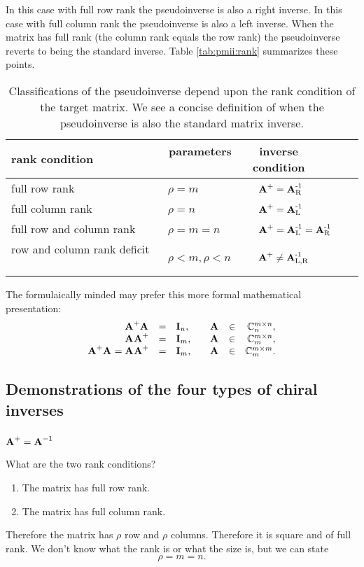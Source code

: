 In this case with full row rank the pseudoinverse is also a right inverse. In this case with full column rank the pseudoinverse is also a left inverse. When the matrix has full rank (the column rank equals the row rank) the pseudoinverse reverts to being the standard inverse. Table \eqref{tab:pmii:rank} summarizes these points.
\begin{table}[bottom]
\begin{center}
\begin{tabular}{lll}
rank condition   & \ parameters \ & \ inverse condition\\\hline\hline
full row rank    & \ $\rho = m $  & \ $\operatorname{\textbf{A}^{\mathrm{+}}} = \operatorname{\textbf{A}^{\mathrm{-1}}_{\mathrm{R}}}$ \\[3pt]
full column rank & \ $\rho = n $  & \ $\operatorname{\textbf{A}^{\mathrm{+}}} = \operatorname{\textbf{A}^{\mathrm{-1}}_{\mathrm{L}}}$ \\[3pt]\hline
full row and column rank \ & \ $\rho = m = n $ \ & \ $\operatorname{\textbf{A}^{\mathrm{+}}} = \operatorname{\textbf{A}^{\mathrm{-1}}_{\mathrm{L}}} = \operatorname{\textbf{A}^{\mathrm{-1}}_{\mathrm{R}}}$\\  row and column rank deficit \ & \ $\rho < m, \rho < n $ \ & \ $\operatorname{\textbf{A}^{\mathrm{+}}} \ne \operatorname{\textbf{A}^{\mathrm{-1}}_{\mathrm{L,R}}}$ \\[6pt]
\end{tabular}
\end{center}
\label{tab:pmii:rank}
\caption{Classifications of the pseudoinverse depend upon the rank condition of the target matrix. We see a concise definition of when the pseudoinverse is also the standard matrix inverse.}
\end{table}%

The formulaically minded may prefer this more formal mathematical presentation:
\begin{equation}
  \begin{array}{rclrcr}
    \operatorname{\textbf{A}^{\mathrm{+}}\textbf{A}^{\mathrm{}}} &=& \textbf{I}_{n}, & \quad \textbf{A}^{\mathrm{}}&\in&\mathbb{C}^{m \times n}_{n},\\
    \operatorname{\textbf{A}^{\mathrm{}}\textbf{A}^{\mathrm{+}}} &=& \textbf{I}_{m}, & \quad \textbf{A}^{\mathrm{}}&\in&\mathbb{C}^{m \times n}_{m},\\
    \operatorname{\textbf{A}^{\mathrm{+}}\textbf{A}^{\mathrm{}}} = \operatorname{\textbf{A}^{\mathrm{}}\textbf{A}^{\mathrm{+}}} &=& \textbf{I}_{m}, & \quad \textbf{A}^{\mathrm{}}&\in&\mathbb{C}^{m \times m}_{m}.\\
  \end{array}
\end{equation}

\subsection{Demonstrations of the four types of chiral inverses}

\subsubsection{$\operatorname{\textbf{A}^{\mathrm{+}}}=\textbf{A}^{\mathrm{-1}}$}
What are the two rank conditions?
\begin{enumerate}
\item The matrix has full row rank.
\item The matrix has full column rank.
\end{enumerate}
Therefore the matrix has $\rho$ row and $\rho$ columns. Therefore it is square and of full rank. We don't know what the rank is or what the size is, but we can state
\begin{equation}
  \rho = m = n.
\end{equation}

